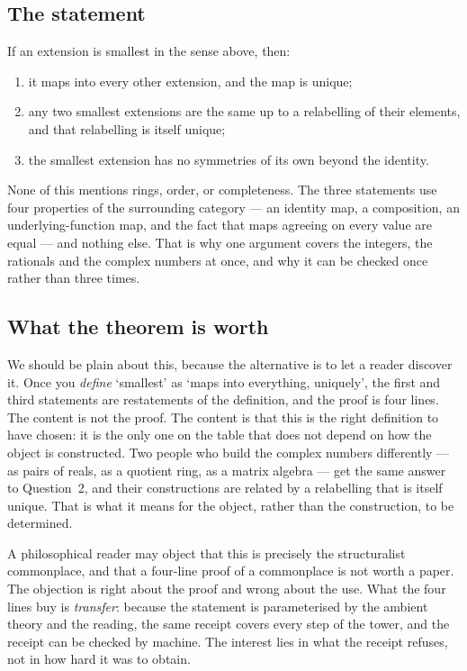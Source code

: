 \documentclass[12pt,a4paper]{article}
\begin{document}
\subsection{The statement}

If an extension is smallest in the sense above, then:

\begin{enumerate}[label=(\arabic*),leftmargin=2.2em]
\item it maps into every other extension, and the map is unique;
\item any two smallest extensions are the same up to a relabelling of their
      elements, and that relabelling is itself unique;
\item the smallest extension has no symmetries of its own beyond the identity.
\end{enumerate}

None of this mentions rings, order, or completeness.  The three statements use
four properties of the surrounding category --- an identity map, a composition, an
underlying-function map, and the fact that maps agreeing on every value are equal
--- and nothing else.  That is why one argument covers the integers, the
rationals and the complex numbers at once, and why it can be checked once rather
than three times.

\subsection{What the theorem is worth}

We should be plain about this, because the alternative is to let a reader
discover it.  Once you \emph{define} `smallest' as `maps into everything,
uniquely', the first and third statements are restatements of the definition, and
the proof is four lines.  The content is not the proof.  The content is that this
is the right definition to have chosen: it is the only one on the table that does
not depend on how the object is constructed.  Two people who build the complex
numbers differently --- as pairs of reals, as a quotient ring, as a matrix algebra
--- get the same answer to Question~2, and their constructions are related by a
relabelling that is itself unique.  That is what it means for the object, rather
than the construction, to be determined.

A philosophical reader may object that this is precisely the structuralist
commonplace, and that a four-line proof of a commonplace is not worth a paper.  The
objection is right about the proof and wrong about the use.  What the four lines
buy is \emph{transfer}: because the statement is parameterised by the ambient
theory and the reading, the same receipt covers every step of the tower, and the
receipt can be checked by machine.  The interest lies in what the receipt refuses,
not in how hard it was to obtain.
\end{document}
